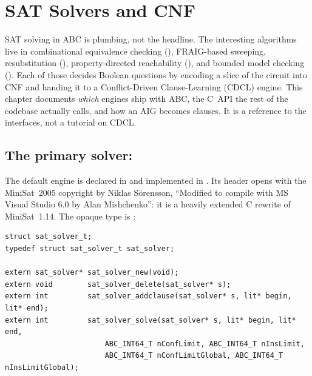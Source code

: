 \chapter{SAT Solvers and CNF}
\label{ch:sat}

SAT solving in ABC is plumbing, not the headline. The interesting algorithms live
in combinational equivalence checking (), FRAIG-based sweeping,
resubstitution (), property-directed reachability (), and
bounded model checking (). Each of those decides Boolean questions by
encoding a slice of the circuit into CNF and handing it to a Conflict-Driven
Clause-Learning (CDCL) engine. This chapter documents \emph{which} engines ship
with ABC, the C~API the rest of the codebase actually calls, and how an AIG
becomes clauses. It is a reference to the interfaces, not a tutorial on CDCL.


\section{The primary solver: }

The default engine is declared in  and implemented
in . Its header opens with the MiniSat~2005
copyright by Niklas S\"orensson, ``Modified to compile with MS Visual Studio 6.0
by Alan Mishchenko'': it is a heavily extended C rewrite of MiniSat~1.14. The
opaque type is :

\begin{lstlisting}[style=abccode]
struct sat_solver_t;
typedef struct sat_solver_t sat_solver;

extern sat_solver* sat_solver_new(void);
extern void        sat_solver_delete(sat_solver* s);
extern int         sat_solver_addclause(sat_solver* s, lit* begin, lit* end);
extern int         sat_solver_solve(sat_solver* s, lit* begin, lit* end,
                       ABC_INT64_T nConfLimit, ABC_INT64_T nInsLimit,
                       ABC_INT64_T nConfLimitGlobal, ABC_INT64_T nInsLimitGlobal);
\end{lstlisting}

